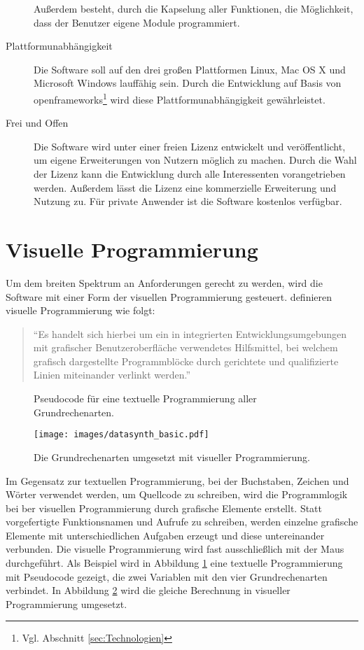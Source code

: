 \documentclass[a4paper, 
               12pt,
               DIV=calc,
               version=first,
               pdftex,
               headsepline,
               footsepline,
               bibtotocnumbered,
               liststotocnumbered]{scrreprt}
\begin{document}
\begin{description}
Außerdem besteht, durch die Kapselung aller Funktionen, die Möglichkeit, dass der
Benutzer eigene Module programmiert.
\item[Plattformunabhängigkeit]
Die Software soll auf den drei großen Plattformen Linux, Mac OS X und Microsoft Windows
lauffähig sein. Durch die Entwicklung auf Basis von openframeworks\footnote{Vgl. Abschnitt \ref{sec:Technologien}}
wird diese Plattformunabhängigkeit gewährleistet.
\item[Frei und Offen]
Die Software wird unter einer freien Lizenz entwickelt und veröffentlicht,
um eigene Erweiterungen von Nutzern möglich zu machen. Durch die Wahl der Lizenz kann
die Entwicklung durch alle Interessenten vorangetrieben werden. Außerdem lässt
die Lizenz eine kommerzielle Erweiterung und Nutzung zu. Für private Anwender
ist die Software kostenlos verfügbar.
\end{description}

\section{Visuelle Programmierung}
\label{sec:visPro}
Um dem breiten Spektrum an Anforderungen gerecht zu werden,
wird die Software mit einer Form der visuellen Programmierung gesteuert.
\citep[S.\,56]{Henning} definieren visuelle Programmierung wie folgt:
\begin{quote}
"`Es handelt sich hierbei um ein in integrierten Entwicklungsumgebungen mit
grafischer Benutzeroberfläche verwendetes Hilfsmittel, bei welchem grafisch
dargestellte Programmblöcke durch gerichtete und qualifizierte Linien miteinander
verlinkt werden."'
\end{quote}
\begin{figure}
\centering

\caption{Pseudocode für eine textuelle Programmierung aller Grundrechenarten.}
\label{fig:textuell}
\end{figure}
\begin{figure}
\centering
\texttt{[image: images/datasynth\_basic.pdf]}
\caption{Die Grundrechenarten umgesetzt mit visueller Programmierung.}
\label{fig:datasynth_basic}
\end{figure}
Im Gegensatz zur textuellen Programmierung, bei der Buchstaben, Zeichen und Wörter
verwendet werden, um Quellcode zu schreiben, wird die Programmlogik bei ber
visuellen Programmierung durch grafische Elemente erstellt.
Statt vorgefertigte Funktionsnamen und Aufrufe zu schreiben, werden einzelne grafische
Elemente mit unterschiedlichen Aufgaben erzeugt und diese untereinander verbunden. Die visuelle Programmierung
wird fast ausschließlich mit der Maus durchgeführt.
Als Beispiel wird in Abbildung \ref{fig:textuell} eine textuelle Programmierung mit
Pseudocode gezeigt, die zwei Variablen mit den vier Grundrechenarten verbindet.
In Abbildung \ref{fig:datasynth_basic} wird die gleiche Berechnung
in visueller Programmierung umgesetzt.
\end{document}
